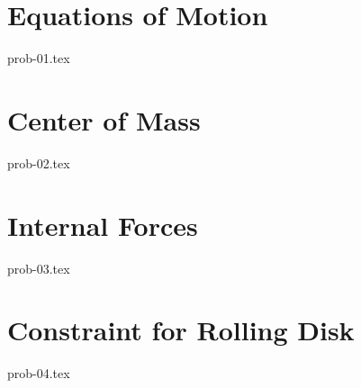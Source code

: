\section{Equations of Motion}

{prob-01.tex}

\section{Center of Mass}

{prob-02.tex}

\section{Internal Forces}

{prob-03.tex}

\section{Constraint for Rolling Disk}\label{rollingdisk}

{prob-04.tex}
